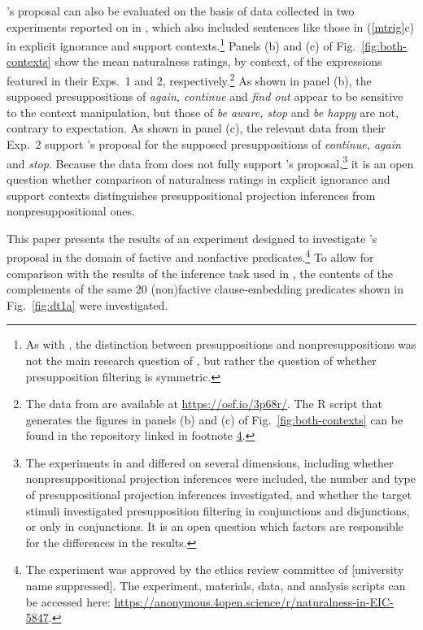 \documentclass[11pt,fleqn]{article}
\newcommand{\6}{\mbox{$[\hspace*{-.6mm}[$}}
\newcommand{\9}{\mbox{$]\hspace*{-.6mm}]$}}
\newcommand{\citepos}[1]{\citeauthor{#1}'s \citeyear{#1}}
\begin{document}
\citepos{mandelkern-etal2020} proposal can also be evaluated on the basis of data collected in two experiments reported on in \citealt{kalomoiros-schwarz2024}, which also included sentences like those in (\ref{mtrig}c) in explicit ignorance and support contexts.\footnote{As with \citealt{mandelkern-etal2020}, the distinction between presuppositions and nonpresuppositions was not the main research question of \citealt{kalomoiros-schwarz2024}, but rather the question of whether presupposition filtering is symmetric.} Panels (b) and (c) of Fig.~\ref{fig:both-contexts} show the mean naturalness ratings, by context, of the expressions featured in their Exps.~1 and 2, respectively.\footnote{The data from \citealt{kalomoiros-schwarz2024} are available at \url{https://osf.io/3p68r/}. The R script that generates the figures in panels (b) and (c) of Fig.~\ref{fig:both-contexts} can be found in the repository linked in footnote \ref{f:github}.} As shown in panel (b), the supposed presuppositions of \emph{again, continue} and \emph{find out} appear to be sensitive to the context manipulation, but those of \emph{be aware, stop} and \emph{be happy} are not, contrary to expectation. As shown in panel (c), the relevant data from their Exp.~2 support \citepos{mandelkern-etal2020} proposal for the supposed presuppositions of \emph{continue, again} and \emph{stop}. Because the data from \citealt[Exp.~1]{kalomoiros-schwarz2024} does not fully support \citepos{mandelkern-etal2020} proposal,\footnote{The experiments in \citealt{mandelkern-etal2020} and \citealt{kalomoiros-schwarz2024} differed on several dimensions, including whether nonpresuppositional projection inferences were included, the number and type of presuppositional projection inferences investigated, and whether the target stimuli investigated presupposition filtering in conjunctions and disjunctions, or only in conjunctions. It is an open question which factors are responsible for the differences in the results.} it is an open question whether comparison of naturalness ratings in explicit ignorance and support contexts distinguishes presuppositional projection inferences from nonpresuppositional ones.

This paper presents the results of an experiment designed to investigate \citepos{mandelkern-etal2020} proposal in the domain of factive and nonfactive predicates.\footnote{\label{f:github}The experiment was approved by the ethics review committee of [university name suppressed]. The experiment, materials, data, and analysis scripts can be accessed here:  \url{https://anonymous.4open.science/r/naturalness-in-EIC-5847}.}  To allow for comparison with the results of the inference task used in \citealt{degen-tonhauser-language},  the contents of the complements of the same 20 (non)factive clause-embedding predicates shown in Fig.~\ref{fig:dt1a} were investigated. 
\end{document}
